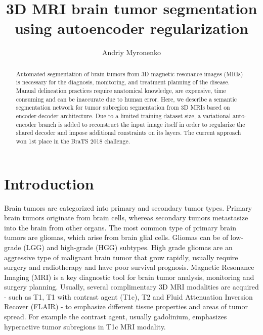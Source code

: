 \documentclass[runningheads]{llncs}
\newcommand{\0}{\ensuremath{\mathbf{0}}}
\newcommand{\1}{\ensuremath{\mathbf{1}}}
\begin{document}
\renewcommand{\arraystretch}{1.4}
\setlength{\tabcolsep}{0.3em}

\title{3D MRI brain tumor segmentation using autoencoder regularization}
\author{Andriy Myronenko}
\maketitle              \begin{abstract}

Automated segmentation of brain tumors from 3D magnetic resonance images (MRIs) is necessary for the diagnosis, monitoring, and treatment planning of the disease. Manual delineation practices require anatomical knowledge, are expensive, time consuming and can be inaccurate due to human error. Here, we describe a semantic segmentation network for tumor subregion segmentation from 3D MRIs based on encoder-decoder architecture.  Due to a limited training dataset size, a variational auto-encoder branch is added to reconstruct the input image itself in order to regularize the shared decoder and impose additional constraints on its layers. The current approach won 1st place in the BraTS 2018 challenge. 

\end{abstract}



\section{Introduction}

Brain tumors are categorized into primary and secondary tumor types.  Primary brain tumors 	 originate from brain cells, whereas  secondary tumors metastasize into the brain from other organs. The most common type of primary brain tumors are gliomas, which arise from brain glial cells.  Gliomas can be of low-grade  (LGG) and high-grade (HGG) subtypes. High grade gliomas are an aggressive  type of malignant brain tumor that grow rapidly, usually require surgery and radiotherapy and have poor survival prognosis. Magnetic Resonance Imaging (MRI) is a key diagnostic tool for brain tumor analysis, monitoring and surgery planning. Usually, several complimentary 3D MRI modalities are acquired - such as T1, T1 with contrast agent (T1c), T2 and Fluid Attenuation Inversion Recover (FLAIR) - to emphasize different tissue properties and areas of tumor spread.  For example the contrast agent, usually gadolinium, emphasizes hyperactive tumor subregions in T1c MRI modality.  
\end{document}
